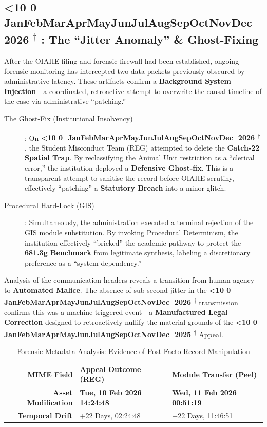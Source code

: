 \documentclass{EMBASSY}
\DeclareRobustCommand{\gmt}[3]{%
    \texorpdfstring{%
        {\color{DateGold}\textbf{%
            \ifnum#1<10 0\fi#1\,\textperiodcentered\,%
            \ifcase#2\or Jan\or Feb\or Mar\or Apr\or May\or Jun\or Jul\or Aug\or Sep\or Oct\or Nov\or Dec\fi
            \,\textperiodcentered\,20#3%
            \textsuperscript{$\dagger$}%
        }}%
    }{%
        (#1/#2/#3)%
    }%
}
\begin{document}
\subsection{\gmt{11}{2}{26}: The ``Jitter Anomaly'' \& Ghost-Fixing}
After the OIAHE filing and forensic firewall had been established, ongoing forensic monitoring has intercepted two data packets previously obscured by administrative latency. These artifacts confirm a \textbf{Background System Injection}---a coordinated, retroactive attempt to overwrite the causal timeline of the case via administrative ``patching.''

\begin{description}
	\item[The Ghost-Fix (Institutional Insolvency)]: On \gmt{19}{1}{26}, the Student Misconduct Team (REG) attempted to delete the \textbf{Catch-22 Spatial Trap}. By reclassifying the Animal Unit restriction as a ``clerical error,'' the institution deployed a \textbf{Defensive Ghost-fix}. This is a transparent attempt to sanitise the record before OIAHE scrutiny, effectively ``patching'' a \textbf{Statutory Breach} into a minor glitch.
	\item[Procedural Hard-Lock (GIS)]: Simultaneously, the administration executed a terminal rejection of the GIS module substitution. By invoking Procedural Determinism, the institution effectively ``bricked'' the academic pathway to protect the \textbf{681.3g Benchmark} from legitimate synthesis, labeling a discretionary preference as a ``system dependency.''
\end{description}

\noindent Analysis of the communication headers reveals a transition from human agency to \textbf{Automated Malice}. The absence of sub-second jitter in the \gmt{19}{1}{26} transmission confirms this was a machine-triggered event---a \textbf{Manufactured Legal Correction} designed to retroactively nullify the material grounds of the \gmt{18}{12}{25} Appeal.

\begin{table}[H]
	\centering
	\caption{Forensic Metadata Analysis: Evidence of Post-Facto Record Manipulation}
	\label{tab:forensic-metadata}
	\begin{tabularx}{\textwidth}{r|X|X}
		\toprule
		\textbf{MIME Field}         & \textbf{Appeal Outcome (REG)}                 & \textbf{Module Transfer (Peel)}               \\
		\midrule
		\textbf{Asset Modification} & \textbf{\color{red}Tue, 10 Feb 2026 14:24:48} & \textbf{\color{red}Wed, 11 Feb 2026 00:51:19} \\
		\midrule
		\textbf{Temporal Drift}     & +22 Days, 02:24:48                            & +22 Days, 11:46:51                            \\
		\bottomrule
	\end{tabularx}
\end{table}
\end{document}
